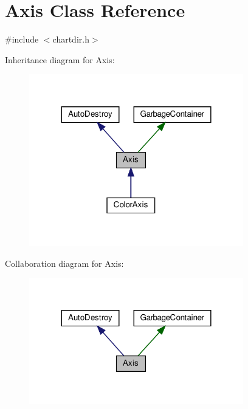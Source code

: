 \hypertarget{class_axis}{}\section{Axis Class Reference}
\label{class_axis}


{\ttfamily \#include $<$chartdir.\+h$>$}



Inheritance diagram for Axis\+:
\nopagebreak
\begin{figure}[H]
\begin{center}
\leavevmode
\includegraphics[width=264pt]{class_axis__inherit__graph}
\end{center}
\end{figure}


Collaboration diagram for Axis\+:
\nopagebreak
\begin{figure}[H]
\begin{center}
\leavevmode
\includegraphics[width=264pt]{class_axis__coll__graph}
\end{center}
\end{figure}

